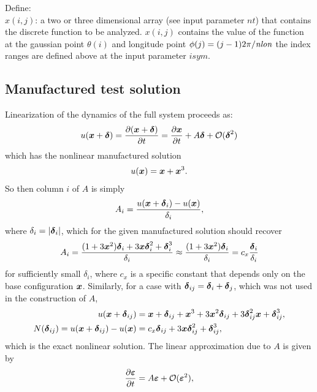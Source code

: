 \documentclass[11pt]{article}
\begin{document}
Define:\\

$x(i,j)$: a two or three dimensional array (see input parameter
        $nt$) that contains the discrete function to be analyzed.
            $x(i,j)$ contains the value of the function at the gaussian
            point $\theta(i)$ and longitude point $\phi(j) = (j-1)2\pi/\nlon$
            the index ranges are defined above at the input parameter
            $isym$.
            
\subsection*{Manufactured test solution}
Linearization of the dynamics of the full system proceeds as:
\begin{gather}
	u(\bx + \bdelta) = \frac{ \partial (\bx + \bdelta) }{ \partial t } = \frac{ \partial \bx }{ \partial t } + A \bdelta + \mathcal{O}(\bdelta^2)
\label{e:full}
\end{gather}
which has the nonlinear manufactured solution
\begin{gather}
	u(\bx) = \bx + \bx^3.
\end{gather}
So then column $i$ of $A$ is simply
\begin{gather}
	A_i = \frac{ u(\bx+\bdelta_i) - u(\bx)}{ \delta_i },
\end{gather}
where $\delta_i = \lvert \bdelta_i \rvert$, which for the given manufactured solution
should recover
\begin{gather}
	A_i = \frac{ (1+3\bx^2)\bdelta_i + 3 \bx \bdelta_i^2+ \bdelta_i^3 }{ \delta_i } 
	      \approx \frac{ (1+3\bx^2)\bdelta_i }{ \delta_i } = c_x \frac{ \bdelta_i}{ \delta_i }
\end{gather}	
for sufficiently small $\delta_i$, where $c_x$ is a specific constant that 
depends only on the base configuration $\bx$. Similarly, for a case with 
$\bdelta_{ij} = \bdelta_i + \bdelta_j$,
which was not used in the construction of $A$,
\begin{align*}
	u(\bx + \bdelta_{ij}) &= \bx + \bdelta_{ij} + \bx^3 + 3 \bx^2 \bdelta_{ij}  + 3 \bdelta_{ij}^2 \bx + \bdelta_{ij}^3, \\
	N(\bdelta_{ij}) = u(\bx + \bdelta_{ij}) - u(\bx) &= c_x \bdelta_{ij} + 3 \bx \bdelta_{ij}^2 + \bdelta_{ij}^3,
\end{align*}
which is the exact nonlinear solution. The linear approximation due to $A$ is given by
\begin{gather}
	\frac{\partial \beps}{\partial t} = A \beps + \mathcal{O}(\beps^2),
\end{gather}
\end{document}
